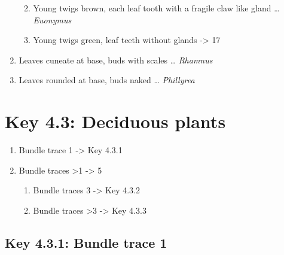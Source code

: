 \documentclass[openany]{book}
\providecommand{\tightlist}{%
  \setlength{\itemsep}{0pt}\setlength{\parskip}{0pt}}
\begin{document}
\begin{enumerate}
  \begin{enumerate}
  \def\labelenumii{\arabic{enumii}.}
  \setcounter{enumii}{14}
  \tightlist
  \item
    Young twigs brown, each leaf tooth with a fragile claw like gland
    \ldots{} \emph{Euonymus}
  \item
    Young twigs green, leaf teeth without glands -\textgreater{} 17
  \end{enumerate}
\item
  Leaves cuneate at base, buds with scales \ldots{} \emph{Rhamnus}
\item
  Leaves rounded at base, buds naked \ldots{} \emph{Phillyrea}
\end{enumerate}

\hypertarget{key-4.3-deciduous-plants}{%
\section{Key 4.3: Deciduous plants}\label{key-4.3-deciduous-plants}}

\begin{enumerate}
\def\labelenumi{\arabic{enumi}.}
\tightlist
\item
  Bundle trace 1 -\textgreater{} Key 4.3.1
\item
  Bundle traces \textgreater{}1 -\textgreater{} 5

  \begin{enumerate}
  \def\labelenumii{\arabic{enumii}.}
  \setcounter{enumii}{2}
  \tightlist
  \item
    Bundle traces 3 -\textgreater{} Key 4.3.2
  \item
    Bundle traces \textgreater{}3 -\textgreater{} Key 4.3.3
  \end{enumerate}
\end{enumerate}

\hypertarget{key-4.3.1-bundle-trace-1}{%
\subsection{Key 4.3.1: Bundle trace 1}\label{key-4.3.1-bundle-trace-1}}
\end{document}
